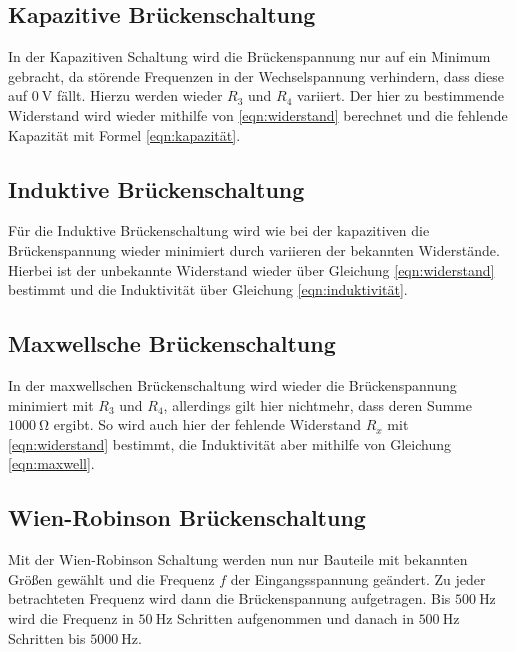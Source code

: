\subsection{Kapazitive Brückenschaltung}
In der Kapazitiven Schaltung wird die Brückenspannung nur auf ein Minimum gebracht, da störende Frequenzen in der 
Wechselspannung verhindern, dass diese auf $\qty{0}{\volt}$ fällt. Hierzu werden wieder $R_3$ und $R_4$ variiert.
Der hier zu bestimmende Widerstand wird wieder mithilfe von \ref{eqn:widerstand} berechnet und die fehlende Kapazität
mit Formel \ref{eqn:kapazität}.

\subsection{Induktive Brückenschaltung}
Für die Induktive Brückenschaltung wird wie bei der kapazitiven die Brückenspannung wieder minimiert durch variieren
der bekannten Widerstände. Hierbei ist der unbekannte Widerstand wieder über Gleichung \ref{eqn:widerstand} bestimmt
und die Induktivität über Gleichung \ref{eqn:induktivität}.

\subsection{Maxwellsche Brückenschaltung}
In der maxwellschen Brückenschaltung wird wieder die Brückenspannung minimiert mit $R_3$ und $R_4$, allerdings gilt hier
nichtmehr, dass deren Summe $\qty{1000}{\ohm}$ ergibt. So wird auch hier der fehlende Widerstand $R_x$ mit \ref{eqn:widerstand}
bestimmt, die Induktivität aber mithilfe von Gleichung \ref{eqn:maxwell}.

\subsection{Wien-Robinson Brückenschaltung}
Mit der Wien-Robinson Schaltung werden nun nur Bauteile mit bekannten Größen gewählt und die Frequenz $f$ 
der Eingangsspannung geändert. Zu jeder betrachteten Frequenz wird dann die Brückenspannung aufgetragen. Bis 
$\qty{500}{\hertz}$ wird die Frequenz in $\qty{50}{\hertz}$ Schritten aufgenommen und danach in $\qty{500}{\hertz}$
Schritten bis $\qty{5000}{\hertz}$.



\label{sec:Durchführung}
